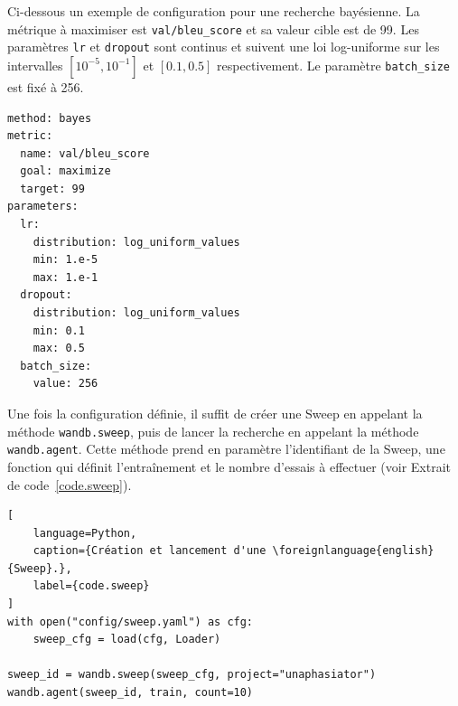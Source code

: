Ci-dessous un exemple de configuration pour une recherche bayésienne.
La métrique à maximiser est \verb|val/bleu_score| et sa valeur cible est de 99.
Les paramètres \verb|lr| et \verb|dropout| sont continus et suivent une loi log-uniforme
sur les intervalles \([10^{-5}, 10^{-1}]\) et \([0.1, 0.5]\) respectivement.
Le paramètre \verb|batch_size| est fixé à 256.

\begin{verbatim}
method: bayes
metric:
  name: val/bleu_score
  goal: maximize
  target: 99
parameters:
  lr:
    distribution: log_uniform_values
    min: 1.e-5
    max: 1.e-1
  dropout:
    distribution: log_uniform_values
    min: 0.1
    max: 0.5
  batch_size:
    value: 256
\end{verbatim}

Une fois la configuration définie, 
il suffit de créer une \foreignlanguage{english}{Sweep} en appelant la méthode \verb|wandb.sweep|,
puis de lancer la recherche en appelant la méthode \verb|wandb.agent|.
Cette méthode prend en paramètre l'identifiant de la \foreignlanguage{english}{Sweep}, 
une fonction qui définit l'entraînement et le nombre d'essais à effectuer (voir Extrait de code~\ref{code.sweep}).

\begin{lstlisting}[
    language=Python,
    caption={Création et lancement d'une \foreignlanguage{english}{Sweep}.},
    label={code.sweep}
]
with open("config/sweep.yaml") as cfg:
    sweep_cfg = load(cfg, Loader)

sweep_id = wandb.sweep(sweep_cfg, project="unaphasiator")
wandb.agent(sweep_id, train, count=10)
\end{lstlisting}



